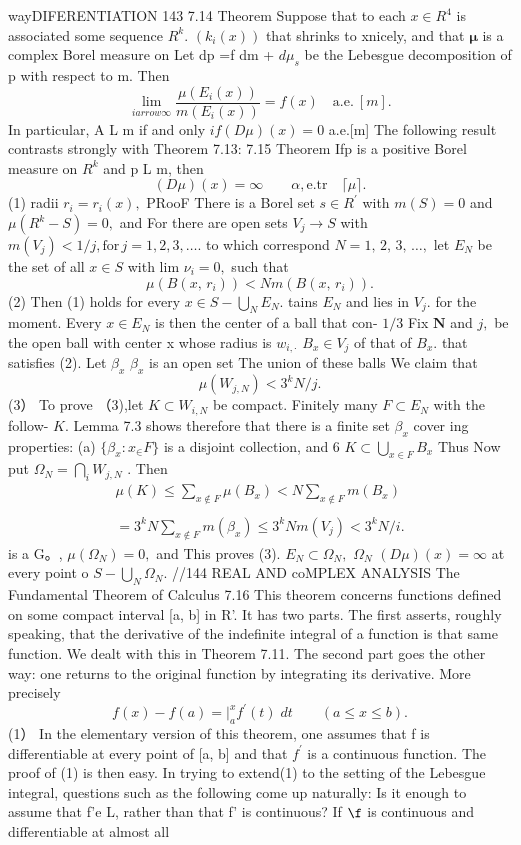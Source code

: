 wayDIFERENTIATION 143 7.14 Theorem Suppose that to each $x\in R^{4}$ is associated some sequence $\textstyle R^{k}.$ $(k_{i}(x))$ that shrinks to xnicely, and that $\boldsymbol{\mu}$ is a complex Borel measure on Let dp =f dm + $d\mu_{s}$ be the Lebesgue decomposition of p with respect to m. Then $$ \operatorname*{lim}_{i arrow\infty}\frac{\mu(E_{i}(x))}{m(E_{i}(x))}=f(x)\quad\mathrm{a.e.}\ [m]. $$ In particular, A L m if and only $i f(D\mu)(x)=0$ a.e.[m] The following result contrasts strongly with Theorem 7.13: 7.15 Theorem Ifp is a positive Borel measure on $R^{k}$ and p L m, then $$ (D\mu)(x)=\infty\quad\quad\alpha,\mathrm{e.tr}\quad\lceil\mu\rceil. $$ (1) radii $r_{i}=r_{i}(x),$ PRooF There is a Borel set $\textstyle s\in R^{\prime}$ with $m(S)=0$ and $\mu(R^{k}-S)=0,$ and For there are open sets $V_{j}\to S$ with $m(V_{j})<1/j,\mathrm{for}\,j=1,2,3,\ldots.$ to which correspond $N=1,\,2,\,3,\,\ldots,$ let $E_{N}$ be the set of all $x\in S$ with lim $\scriptstyle\nu_{i}=0,$ such that $$ \mu(B(x,\,r_{i}))<N m(B(x,\,r_{i})). $$ (2) Then (1) holds for every $x\in S-\bigcup_{N}E_{N}.$ tains $E_{N}$ and lies in $V_{j}.$ for the moment. Every $x\in E_{N}$ is then the center of a ball that con- $1/3$ Fix ${\boldsymbol{N}}$ and $j,$ be the open ball with center x whose radius is $w_{i,\cdot}$ $B_{x}\in V_{j}$ of that of $B_{x}.$ that satisfies (2). Let $\beta_{x}$ $\beta_{x}$ is an open set The union of these balls We claim that $$ \mu(W_{j,N})<3^{k}N/j. $$ (3） To prove （3),let $K\subset W_{i,N}$ be compact. Finitely many $F\subset E_{N}$ with the follow- $K.$ Lemma 7.3 shows therefore that there is a finite set $\beta_{x}$ cover ing properties: (a) $\{\beta_{x}\colon x_{\in}F\}$ is a disjoint collection, and 6 $K\subset\bigcup_{x\in F}B_{x}$ Thus Now put $\Omega_{N}=\bigcap_{i}W_{j,N}$ . Then $$ \begin{array}{c}{{\mu(K)\leq\sum_{x\not\in F}\mu(B_{x})<N\sum_{x\not\in F}m(B_{x})}}\\ {{\ }}\\ {{=3^{k}N\sum_{x\not\in F}m(\beta_{x})\leq3^{k}N m(V_{j})<3^{k}N/i.}}\end{array} $$ is a G。, $\mu(\Omega_{N})=0,$ and This proves (3). $E_{N}\subset\Omega_{N},$ $\Omega_{N}$ $(D\mu)(x)=\infty$ at every point o $S-\bigcup_{N}\Omega_{N}.$ //144 REAL AND coMPLEX ANALYSIS The Fundamental Theorem of Calculus 7.16 This theorem concerns functions defined on some compact interval [a, b] in R'. It has two parts. The first asserts, roughly speaking, that the derivative of the indefinite integral of a function is that same function. We dealt with this in Theorem 7.11. The second part goes the other way: one returns to the original function by integrating its derivative. More precisely $$ f(x)-f(a)=\left.\right|_{a}^{x}f^{\prime}(t)\;d t\qquad(a\leq x\leq b). $$ (1） In the elementary version of this theorem, one assumes that f is differentiable at every point of [a, b] and that $f^{\prime}$ is a continuous function. The proof of (1) is then easy. In trying to extend(1) to the setting of the Lebesgue integral, questions such as the following come up naturally: Is it enough to assume that f'e L, rather than that f' is continuous? If $\boldsymbol{\f}$ is continuous and differentiable at almost all 